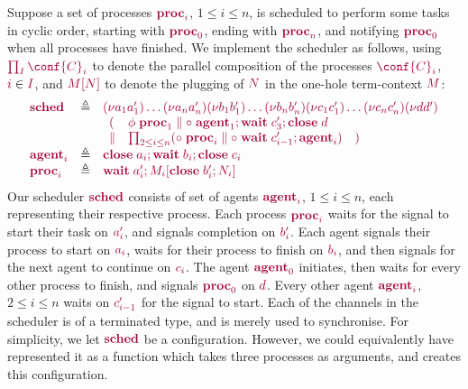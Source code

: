 \documentclass[main.tex]{subfiles}
\begin{document}
\begin{example}\label{sec:pgv-example}
Suppose a set of processes $\tm{\proc{i}}$, $1\leq{i}\leq{n}$, is scheduled to perform some tasks in cyclic order, starting with $\tm{\proc0}$, ending with $\tm{\proc{n}}$, and notifying $\tm{\proc0}$ when all processes have finished.
% 
We implement the scheduler as follows, using $\tm{\prod_{I}\conf{C}_i}$ to denote the parallel composition of the processes $\tm{\conf{C}_i}$, $\tm{i}\in\tm{I}$, and $\tm{\plug{M}{N}}$ to denote the plugging of $\tm{N}$ in the one-hole term-context $\tm{M}$:
\[
  \begin{array}{lrlr}
    \tm{\sched}
    & \defeq & \tm{\res{a_1}{a'_1}{\dots{\res{a_n}{a'_n}{}}}}
               \tm{\res{b_1}{b'_1}{\dots{\res{b_n}{b'_n}{}}}}
               \tm{\res{c_1}{c'_1}{\dots{\res{c_n}{c'_n}{}}}}
               \tm{\res{d}{d'}{}}
    \\ &     & \tm{\begin{array}{lll}
                     (
                     & \phi\;\proc1
                     \parallel
                     \child\;\andthen{\agent1}{\andthen{\wait\;{c'_3}}{\close\;{d}}}
                     \\
                     \parallel
                     &
                     \prod_{2\leq{i}\leq{n}}
                     (\child\;\proc{i} \parallel \child\;\andthen{\wait\;{c'_{i-1}}}{\agent{i}})
                     & )
                   \end{array}}
    \\
    \tm{\agent{i}}
    & \defeq & \tm{\andthen{\close\;{a_i}}{\andthen{\wait\;{b_i}}{\close\;{c_i}}}}
    \\
    \tm{\proc{i}}
    & \defeq & \tm{\andthen{\wait\;{a'_i}}{\plug{M_i}{\andthen{\close\;{b'_i}}{N_i}}}}
  \end{array}
\]
Our scheduler $\tm{\sched}$ consists of set of agents $\tm{\agent{i}}$, $1\leq{i}\leq{n}$, each representing their respective process. Each process $\tm{\proc{i}}$ waits for the signal to start their task on $\tm{a'_i}$, and signals completion on $\tm{b'_i}$. Each agent signals their process to start on $\tm{a_i}$, waits for their process to finish on $\tm{b_i}$, and then signals for the next agent to continue on $\tm{c_i}$. The agent $\tm{\agent0}$ initiates, then waits for every other process to finish, and signals $\tm{\proc0}$ on $\tm{d}$. Every other agent $\tm{\agent{i}}$, $2\leq{i}\leq{n}$ waits on $\tm{c'_{i-1}}$ for the signal to start.
Each of the channels in the scheduler is of a terminated type, and is merely used to synchronise.
For simplicity, we let $\tm{\sched}$ be a configuration. However, we could equivalently have represented it as a function which takes three processes as arguments, and creates this configuration.
\end{example}
\end{document}
